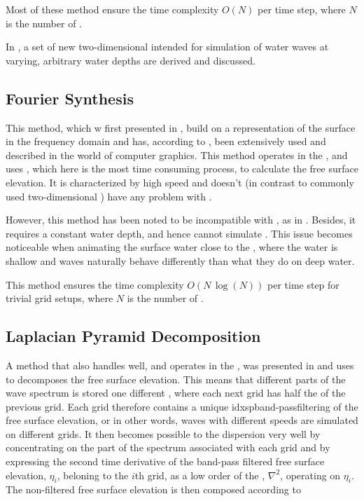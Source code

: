 Most of these method ensure the time complexity $O(N)$ per time step, where $N$ is the number of .

In , a set of new two-dimensional \PDEs intended for simulation of water waves at varying, arbitrary water depths are derived and discussed.

\subsection{Fourier Synthesis}

This method, which w first presented in \citep{Mastin1987}, build on  a representation of the surface in the frequency domain and has, according to \citep{Monnier}, been extensively used and described in the world of computer graphics. This method operates in the , and uses \FFT, which here is the most time consuming process, to calculate the free surface elevation. It is characterized by high speed and doesn't (in contrast to commonly used two-dimensional \PDEs) have any problem with .

However, this method has been noted to be incompatible with \FSI, as in \citep{}. Besides, it requires a constant water depth, and hence cannot simulate . This issue becomes noticeable when animating the surface water close to the , where the water is shallow and waves naturally behave differently than what they do on deep water.

This method ensures the time complexity $O(N\,\log(N))$ per time step for trivial grid setups, where $N$ is the number of .

\subsection{Laplacian Pyramid Decomposition}

A method that also handles  well, and operates in the , was presented in \citep{Ottosson2011} and uses \LPD to decomposes the free surface elevation. This means that different parts of the wave spectrum is stored one different \grids, where each next grid has half the \resolution of the previous grid. Each grid therefore contains a unique idxsp{band-pass}{filter}{ing} of the free surface elevation, or in other words, waves with different speeds are simulated on different grids. It then becomes possible to \approximate the dispersion very well by concentrating on the part of the spectrum associated with each grid and by expressing the second time derivative of the band-pass filtered free surface elevation, $\eta_i$, beloning to the $i$th grid, as a low order \polynomial of the , $\nabla^2$, operating on $\eta_i$. The non-filtered free surface elevation is then composed according to

